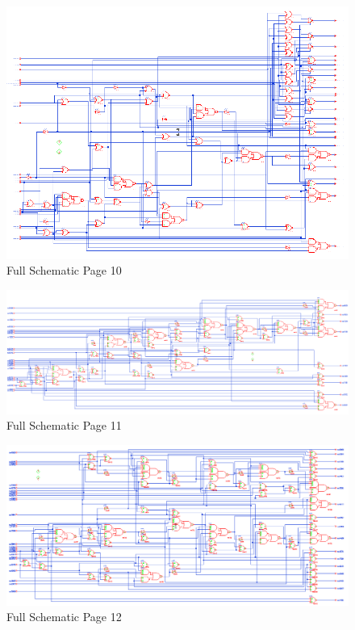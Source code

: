 \documentclass[11pt]{article}
\begin{document}
		
		\begin{figure}[H] 
			\centering 
			\includegraphics[width=\textwidth,height=\dimexpr\textheight-4\baselineskip-\abovecaptionskip-\belowcaptionskip\relax,keepaspectratio]{"Pictures/Full Schematic Page 10"}
			\caption{Full Schematic Page 10} 
			\label{fig:Full-Schematic-Page-10} 
		\end{figure}
		
		
		\begin{figure}[H] 
			\centering 
			\includegraphics[width=\textwidth,height=\dimexpr\textheight-4\baselineskip-\abovecaptionskip-\belowcaptionskip\relax,keepaspectratio]{"Pictures/Full Schematic Page 11"}
			\caption{Full Schematic Page 11} 
			\label{fig:Full-Schematic-Page-11} 
		\end{figure}
		
		
		\begin{figure}[H] 
			\centering 
			\includegraphics[width=\textwidth,height=\dimexpr\textheight-4\baselineskip-\abovecaptionskip-\belowcaptionskip\relax,keepaspectratio]{"Pictures/Full Schematic Page 12"}
			\caption{Full Schematic Page 12} 
			\label{fig:Full-Schematic-Page-12} 
		\end{figure}
		
\end{document}
